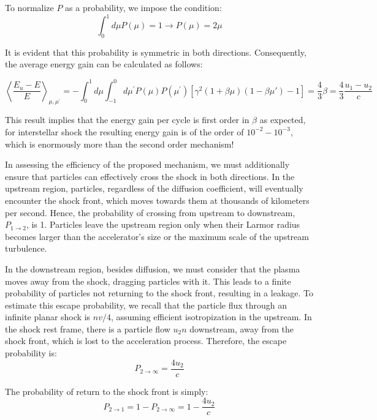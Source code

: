 To normalize \( P \) as a probability, we impose the condition:
%
\begin{equation}
\int_0^1 d\mu P(\mu) = 1 \rightarrow P(\mu) = 2\mu 
\end{equation}

It is evident that this probability is symmetric in both directions. Consequently, the average energy gain can be calculated as follows:
%
\begin{remark}
\begin{equation}
\left\langle \frac{E_u -E}{E} \right\rangle_{\mu,\mu^\prime} = -\int_0^1 d\mu \int_{-1}^0 d\mu^\prime P(\mu)P(\mu^\prime)\left[ \gamma^2(1+\beta\mu)(1-\beta\mu')-1 \right] = \frac{4}{3} \beta = \frac{4}{3} \frac{u_1-u_2}{c}
\end{equation}
\end{remark}

This result implies that the energy gain per cycle is first order in $\beta$ as expected, for interstellar shock the resulting energy gain is of the order of \( 10^{-2}-10^{-3} \), which is enormously more than the second order mechanism! 

In assessing the efficiency of the proposed mechanism, we must additionally ensure that particles can effectively cross the shock in both directions. 
%
In the upstream region, particles, regardless of the diffusion coefficient, will eventually encounter the shock front, which moves towards them at thousands of kilometers per second. Hence, the probability of crossing from upstream to downstream, \( P_{1 \rightarrow 2} \), is 1. Particles leave the upstream region only when their Larmor radius becomes larger than the accelerator's size or the maximum scale of the upstream turbulence.

In the downstream region, besides diffusion, we must consider that the plasma moves away from the shock, dragging particles with it. This leads to a finite probability of particles not returning to the shock front, resulting in a leakage. To estimate this escape probability, we recall that the particle flux through an infinite planar shock is \( n v / 4 \), assuming efficient isotropization in the upstream. In the shock rest frame, there is a particle flow \( u_2 n \) downstream, away from the shock front, which is lost to the acceleration process. Therefore, the escape probability is:
%
\begin{equation}
P_{2 \rightarrow \infty} = \frac{4 u_2}{c}
\end{equation}

The probability of return to the shock front is simply:
%
\begin{equation}
P_{2 \rightarrow 1} = 1 - P_{2 \rightarrow \infty} = 1 - \frac{4 u_2}{c}
\end{equation}

